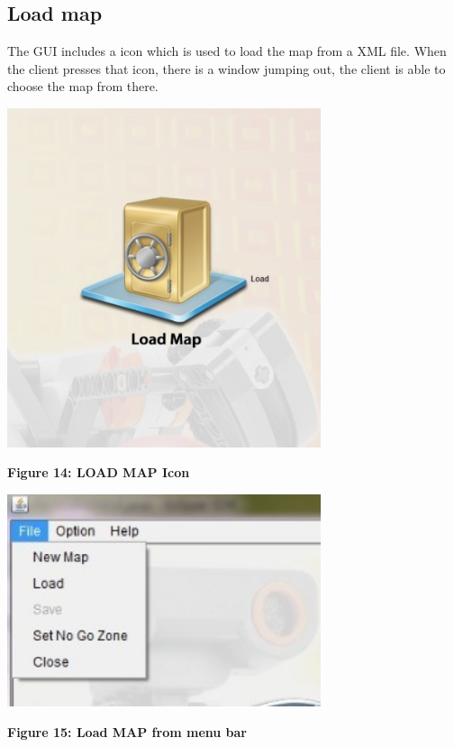 \documentclass[11pt, a4paper]{report}
\begin{document}
\subsection{Load map}
The GUI includes a icon which is used to load the map from a XML file. When the client presses that icon, there is a window jumping out, the client is able to choose the map from there.
\begin{center}
 \includegraphics[width=9.20cm]{loadmap_quick}
\end{center}
\begin{center}
\textbf {Figure 14: LOAD MAP Icon} \\[0.3cm]
\end{center}
\begin{center}
 \includegraphics[width=9.20cm]{Menu_file.jpg}
\end{center}
\begin{center}
\textbf {Figure 15: Load MAP from menu bar} \\[0.3cm]
\end{center}
\end{document}
